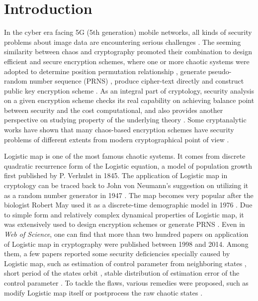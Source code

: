 \documentclass{ws-ijbc}
\begin{document}

\section{Introduction}

In the cyber era facing 5G (5th generation) mobile networks, all kinds of security problems about image
data are encountering serious challenges \cite{Li:Optimal:SP2011,Jian:Move:TIFS15}. The seeming similarity between chaos and cryptography promoted
their combination to design efficient and secure encryption schemes,
where one or more chaotic systems were adopted to determine position permutation
relationship \cite{Chen:Symmetric:CSF2004,Fridrich:Symmetric:IJBC1998}, generate pseudo-random number sequence (PRNS) \cite{Mao:Novel:IJBC2004,Zhu:Novel:OC2012,YuSM:feedback:IJBC2014,YCZhou:Chaotic:TC2015}, produce cipher-text directly \cite{Baptista:Lotistic:PLA98}
and construct public key encryption scheme \cite{Bose:public:PRL05}.
As an integral part of cryptology, security analysis on a given encryption scheme checks its real capability on achieving
balance point between security and the cost computational, and also provides another
perspective on studying property of the underlying theory \cite{KNUTH:congruential:IEEETIT1985,Alvarez:Some:IJBC2006}.
Some cryptanalytic works have shown that many chaos-based
encryption schemes have security problems of different extents from
modern cryptographical point of view \cite{Alvarez:Cryptanalysis:PLA2004,
Chen:Chosen:CSII2006, Solak:Cryptanalysis:IJBC2010, Li:Optimal:SP2011,
Li:hyperchaotic:ND2013,Cqli:breakmodulo:IJBC13}.

Logistic map is one of the most famous chaotic systems. It comes from
discrete quadratic recurrence form of the Logistic equation,
a model of population growth first published by P. Verhulst in 1845.
The application of Logistic map in cryptology
can be traced back to John von Neumann's suggestion on utilizing it as a random number generator in 1947 \cite{Neumann:logistic:BAMS47}.
The map becomes very popular after the biologist Robert May used it as a discrete-time demographic model in 1976 \cite{MAY:Logistic:Nature1976}.
Due to simple form and relatively complex dynamical properties of Logistic map, it was extensively used to design encryption
schemes or generate PRNS \cite{Baptista:Lotistic:PLA98,Phatak:LogisticRNG:PRE95,Kocarev:Logistic:PLA01,Jakimoski:Chaos:CSI2001}. Even in \textit{Web of Science}, one can find that more than two hundred papers on application of Logistic map in cryptography were published between 1998 and 2014.
Among them, a few papers reported some security deficiencies specially caused by Logistic map, such as estimation of control parameter from neighboring states \cite{Li:AttackingRCES2008}, short period of the states orbit \cite{Persohn:AnalyzeLogistic:CSF12,Li:LogisticPRNG:ITVLSIS2012},
stable distribution of estimation error of the control parameter \cite{Li:logistic:ND2014}. To tackle the flaws, various remedies were proposed, such as modify Logistic map itself \cite{Sam:TLM:MTA2012} or postprocess the raw chaotic states \cite{Li:LogisticPRNG:ITVLSIS2012}.
\end{document}
